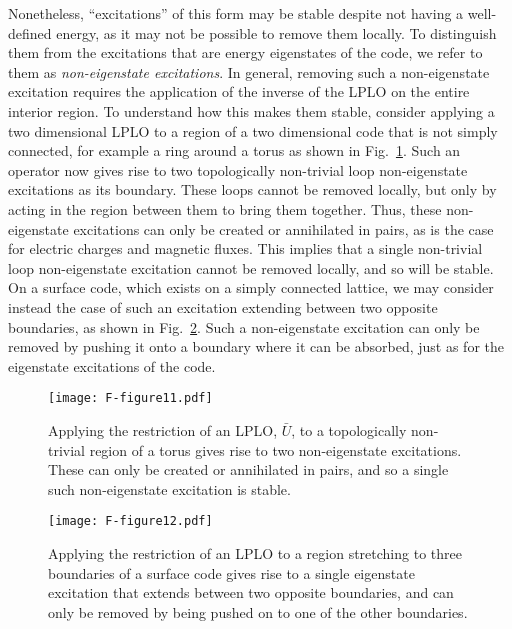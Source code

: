 \documentclass[pra,twocolumn,a4paper,nofootinbib]{revtex4-1}
\begin{document}
Nonetheless, ``excitations'' of this form may be stable despite not having a well-defined energy, as it may not be possible to remove them locally. To distinguish them from the excitations that are energy eigenstates of the code, we refer to them as \textit{non-eigenstate excitations}. In general, removing such a non-eigenstate excitation requires the application of the inverse of the LPLO on the entire interior region.  To understand how this makes them stable, consider applying a two dimensional LPLO to a region of a two dimensional code that is not simply connected, for example a ring around a torus as shown in Fig.~\ref{fig:TCLO}. Such an operator now gives rise to two topologically non-trivial loop non-eigenstate excitations as its boundary. These loops cannot be removed locally, but only by acting in the region between them to bring them together. Thus, these non-eigenstate excitations can only be created or annihilated in pairs, as is the case for electric charges and magnetic fluxes. This implies that a single non-trivial loop non-eigenstate excitation cannot be removed locally, and so will be stable. On a surface code, which exists on a simply connected lattice, we may consider instead the case of such an excitation extending between two opposite boundaries, as shown in Fig.~\ref{fig:SCLO}. Such a non-eigenstate excitation can only be removed by pushing it onto a boundary where it can be absorbed, just as for the eigenstate excitations of the code. 

\begin{figure}
\centering
\texttt{[image: F-figure11.pdf]}
\caption{Applying the restriction of an LPLO, $\bar{U}$, to a topologically non-trivial region of a torus gives rise to two non-eigenstate excitations. These can only be created or annihilated in pairs, and so a single such non-eigenstate excitation is stable. \label{fig:TCLO}}
\end{figure}

\begin{figure}
\centering
\texttt{[image: F-figure12.pdf]}
\caption{Applying the restriction of an LPLO to a region stretching to three boundaries of a surface code gives rise to a single eigenstate excitation that extends between two opposite boundaries, and can only be removed by being pushed on to one of the other boundaries. \label{fig:SCLO}}
\end{figure}
\end{document}
